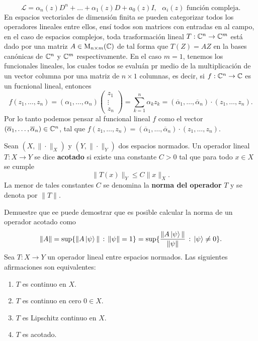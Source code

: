 \documentclass[main.tex]{subfiles}
\begin{document}
\[
    \mathcal{L}=\alpha_n(z)D^n+\dots+\alpha_1(z)D+a_0(z)I,\text{ $\alpha_i(z)$ función compleja.}
\]
\eje En espacios vectoriales de dimensión finita se pueden categorizar todos los operadores lineales entre ellos, ensí todos son matrices con entradas en al campo, en el caso de espacios complejos, toda trasformación lineal \(T:\mathbb C ^n\rightarrow\mathbb C ^m\) está dado por una matriz \(A\in\textrm{M}_{n\times m}(\mathbb C )\) de tal forma que \(T(Z)=AZ\) en la bases canónicas de \(\mathbb C ^n\) y \(\mathbb C ^m\) respectivamente. En el caso \(m=1\), tenemos los funcionales lineales, los cuales todos se evaluán pr medio de la multiplicación de un vector columna por una matriz de \(n\times 1\) columnas, es decir, si \(f:\mathbb C ^n\rightarrow\mathbb C \) es un fucnional lineal, entonces
\[
f(z_1,\dots,z_n)=(\alpha_1,\dots,\alpha_n)\begin{pmatrix}z_1\\ \vdots \\ z_n\end{pmatrix}=\sum_{k=1}^n \alpha_kz_k = (\overline{\alpha}_1,\dots,\overline{\alpha}_n)\cdot(z_1,\dots,z_n).
\]
\noindent Por lo tanto podemos pensar al funcional lineal \(f\) como el vector \((\overline{\alpha}_1,\dots,\overline{\alpha}_n)\in\mathbb{C}^n\), tal que \(f(z_1,\dots,z_n)=(\overline{\alpha}_1,\dots,\overline{\alpha}_n)\cdot(z_1,\dots,z_n)\).

\begin{def.}
Sean \((X, \|\cdot\|_X)\) y \((Y, \|\cdot\|_Y)\) dos espacios normados. Un operador lineal \(T: X \to Y\) se dice \textbf{acotado} si existe una constante \(C > 0\) tal que para todo \(x \in X\) se cumple
\[
\|T(x)\|_Y \leq C \|x\|_X.
\]
La menor de tales constantes \(C\) se denomina la \textbf{norma del operador} \(T\) y se denota por \(\|T\|\).
\end{def.}
\exe Demuestre que ee puede demostrar que es posible calcular la norma de un operador acotado como
\[
\|A\|=\sup\{\|A\ket{\psi}\|\,:\,\|\psi\|=1\}=\sup\{\frac{\|A\ket{\psi}\|}{\|\psi\|}\,:\,\ket{\psi}\neq 0\}.
\]
\obs Sea \(T: X \to Y\) un operador lineal entre espacios normados. Las siguientes afirmaciones son equivalentes:
\begin{enumerate}
    \item \(T\) es continuo en \(X\).
    \item \(T\) es continuo en cero \(0 \in X\).
    \item \(T\) es Lipschitz continuo en \(X\).
    \item \(T\) es acotado.
\end{enumerate}
\end{document}
